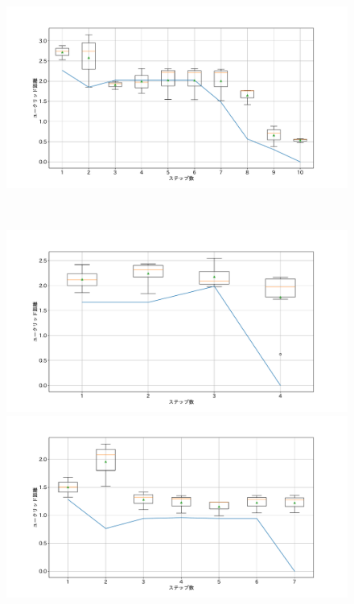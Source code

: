 \begin{figure}[h]
\begin{minipage}[b]{0.48\linewidth}
 \end{minipage}
 \begin{minipage}[b]{0.48\linewidth}
  \centering
  \includegraphics[scale=0.15]{./imgs/gaChange/sofa2_2.pdf}
 \end{minipage}\\
 \begin{minipage}[b]{0.48\linewidth}
  \centering
  \includegraphics[scale=0.15]{./imgs/gaChange/sofa1_3.pdf}
 \end{minipage}
 \begin{minipage}[b]{0.48\linewidth}
  \centering
  \includegraphics[scale=0.15]{./imgs/gaChange/sofa2_3.pdf}

\end{minipage}
\end{figure}
